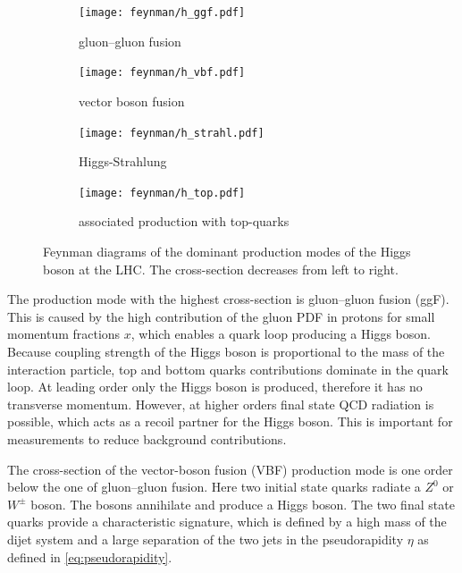 \begin{figure}[htb]
    \centering
    \begin{subfigure}[t]{0.302\textwidth}
        \texttt{[image: feynman/h\_ggf.pdf]}
        \caption{gluon--gluon fusion}\label{fig:theory:higgs:ggf}
    \end{subfigure}
    \begin{subfigure}[t]{0.201\textwidth}
        \captionsetup{justification=raggedright}
        \texttt{[image: feynman/h\_vbf.pdf]}
        \caption{vector boson fusion}\label{fig:theory:higgs:vbf}
    \end{subfigure}
    \begin{subfigure}[t]{0.201\textwidth}
        \texttt{[image: feynman/h\_strahl.pdf]}
        \caption{Higgs-Strahlung}\label{fig:theory:higgs:vh}
    \end{subfigure}
    \begin{subfigure}[t]{0.246\textwidth}
        \captionsetup{justification=raggedright}
        \texttt{[image: feynman/h\_top.pdf]}
        \caption{associated \mbox{production} with top-quarks}\label{fig:theory:higgs:tassoc}
    \end{subfigure}
    \caption{Feynman diagrams of the dominant production modes of the Higgs boson at the LHC\@. The cross-section
             decreases from left to right.}\label{fig:theory:higgs:production}
\end{figure}

The production mode with the highest cross-section is gluon--gluon fusion (ggF).
This is caused by the high contribution of the gluon PDF in protons for small momentum fractions $x$, which enables
a quark loop producing a Higgs boson. Because coupling strength of the Higgs boson is proportional to the mass of the
interaction particle, top and bottom quarks contributions dominate in the quark loop.
At leading order only the Higgs boson is produced, therefore it has no transverse momentum.
However, at higher orders final state QCD radiation is possible, which acts as a recoil partner for the Higgs boson.
This is important for measurements to reduce background contributions.

The cross-section of the vector-boson fusion (VBF) production mode is one order below the one of gluon--gluon fusion.
Here two initial state quarks radiate a $Z^0$ or $W^\pm$ boson.
The bosons annihilate and produce a Higgs boson.
The two final state quarks provide a characteristic signature, which is defined by a high mass of the dijet system
and a large separation of the two jets in the pseudorapidity $\eta$ as defined in \cref{eq:pseudorapidity}.

